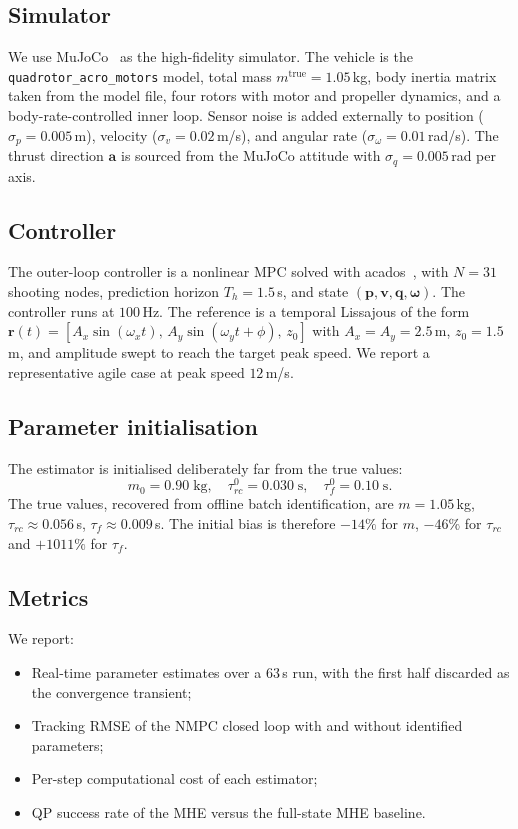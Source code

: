 \documentclass[lettersize,journal]{IEEEtran}
\newcommand{\vect}[1]{\bm{#1}}
\begin{document}
\subsection{Simulator}
We use MuJoCo~\cite{todorov2012mujoco} as the high-fidelity
simulator.  The vehicle is the \texttt{quadrotor\_acro\_motors}
model, total mass $m^{\text{true}}=1.05$\,kg, body inertia
matrix taken from the model file, four rotors with motor and
propeller dynamics, and a body-rate-controlled inner loop.
Sensor noise is added externally to position
($\sigma_p=0.005$\,m), velocity ($\sigma_v=0.02$\,m/s), and
angular rate ($\sigma_\omega=0.01$\,rad/s).  The thrust direction
$\vect a$ is sourced from the MuJoCo attitude with
$\sigma_q=0.005$\,rad per axis.

\subsection{Controller}
The outer-loop controller is a nonlinear MPC solved with
acados~\cite{verschueren2022acados}, with $N=31$ shooting nodes,
prediction horizon $T_h=1.5$\,s, and state
$(\vect p,\vect v,\vect q,\vect\omega)$.  The controller runs at
$100$\,Hz.  The reference is a temporal Lissajous of the form
$\vect r(t)=[A_x\sin(\omega_x t),\,A_y\sin(\omega_y t+\phi),\,z_0]$
with $A_x=A_y=2.5$\,m, $z_0=1.5$\,m, and amplitude swept to reach
the target peak speed.  We report a representative agile case
at peak speed $12$\,m/s.

\subsection{Parameter initialisation}
The estimator is initialised deliberately far from the true
values:
\[
m_0 = 0.90\;\text{kg},\quad
\tau_{rc}^0 = 0.030\;\text{s},\quad
\tau_f^0 = 0.10\;\text{s}.
\]
The true values, recovered from offline batch identification,
are $m=1.05$\,kg, $\tau_{rc}\approx 0.056$\,s,
$\tau_f\approx 0.009$\,s.  The initial bias is therefore $-14\%$
for $m$, $-46\%$ for $\tau_{rc}$ and $+1011\%$ for $\tau_f$.

\subsection{Metrics}
We report:
\begin{itemize}
\item Real-time parameter estimates over a $63$\,s run, with the
first half discarded as the convergence transient;
\item Tracking RMSE of the NMPC closed loop with and without
identified parameters;
\item Per-step computational cost of each estimator;
\item QP success rate of the MHE versus the full-state MHE
baseline.
\end{itemize}
\end{document}
